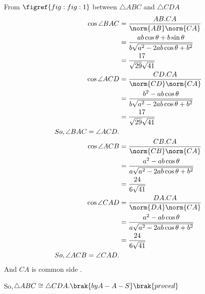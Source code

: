 From $\figref{fig:fig:1}$ between $\triangle ABC $ and $\triangle CDA$
\begin{align}
\cos{\angle BAC} &= \frac{AB.CA}{\norm{AB}\norm{CA}}\\
&=\frac{ab\cos{\theta}+b\sin{\theta}}{b\sqrt{a^2-2ab\cos{\theta}+b^2}}\\
&=\frac{17}{\sqrt{29}\sqrt{41}}\\
\cos{\angle ACD} &= \frac{CD.CA}{\norm{CD}\norm{CA}}\\
&= \frac{b^2-ab\cos{\theta}}{b\sqrt{a^2-2ab\cos{\theta}+b^2}}\\
&=\frac{17}{\sqrt{29}\sqrt{41}}\\
So,\angle BAC = \angle ACD.\\
\cos{\angle ACB} &= \frac{CB.CA}{\norm{CB}\norm{CA}}\\
&=\frac{a^2-ab\cos{\theta}}{a\sqrt{a^2-2ab\cos{\theta}+b^2}}\\
&=\frac{24}{6\sqrt{41}}\\
\cos{\angle} CAD &= \frac{DA.CA}{\norm{DA}\norm{CA}}\\
&=\frac{a^2-ab\cos{\theta}}{a\sqrt{a^2-2ab\cos{\theta}+b^2}}\\
&=\frac{24}{6\sqrt{41}}\\
So,\angle ACB = \angle CAD.
\end{align}
And $CA$ is common side .

So,$\triangle ABC \cong \triangle CDA.\brak{by A-A-S}\brak{proved}$


